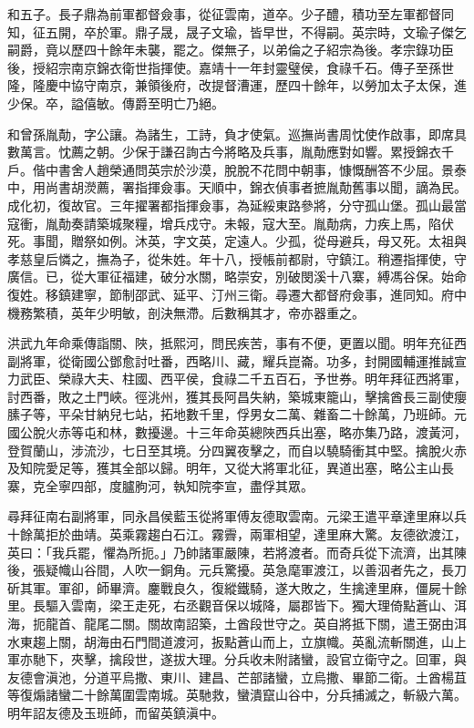 \begin{pinyinscope}
和五子。長子鼎為前軍都督僉事，從征雲南，道卒。少子醴，積功至左軍都督同知，征五開，卒於軍。鼎子晟，晟子文瑜，皆早世，不得嗣。英宗時，文瑜子傑乞嗣爵，竟以歷四十餘年未襲，罷之。傑無子，以弟倫之子紹宗為後。孝宗錄功臣後，授紹宗南京錦衣衛世指揮使。嘉靖十一年封靈璧侯，食祿千石。傳子至孫世隆，隆慶中協守南京，兼領後府，改提督漕運，歷四十餘年，以勞加太子太保，進少保。卒，謚僖敏。傳爵至明亡乃絕。

和曾孫胤勣，字公讓。為諸生，工詩，負才使氣。巡撫尚書周忱使作啟事，即席具數萬言。忱薦之朝。少保于謙召詢古今將略及兵事，胤勣應對如響。累授錦衣千戶。偕中書舍人趙榮通問英宗於沙漠，脫脫不花問中朝事，慷慨酬答不少屈。景泰中，用尚書胡濙薦，署指揮僉事。天順中，錦衣偵事者摭胤勣舊事以聞，謫為民。成化初，復故官。三年擢署都指揮僉事，為延綏東路參將，分守孤山堡。孤山最當寇衝，胤勣奏請築城聚糧，增兵戍守。未報，寇大至。胤勣病，力疾上馬，陷伏死。事聞，贈祭如例。沐英，字文英，定遠人。少孤，從母避兵，母又死。太祖與孝慈皇后憐之，撫為子，從朱姓。年十八，授帳前都尉，守鎮江。稍遷指揮使，守廣信。已，從大軍征福建，破分水關，略崇安，別破閔溪十八寨，縛馮谷保。始命復姓。移鎮建寧，節制邵武、延平、汀州三衛。尋遷大都督府僉事，進同知。府中機務繁積，英年少明敏，剖決無滯。后數稱其才，帝亦器重之。

洪武九年命乘傳詣關、陜，抵熙河，問民疾苦，事有不便，更置以聞。明年充征西副將軍，從衛國公鄧愈討吐番，西略川、藏，耀兵崑崙。功多，封開國輔運推誠宣力武臣、榮祿大夫、柱國、西平侯，食祿二千五百石，予世券。明年拜征西將軍，討西番，敗之土門峽。徑洮州，獲其長阿昌失納，築城東籠山，擊擒酋長三副使癭膆子等，平朵甘納兒七站，拓地數千里，俘男女二萬、雜畜二十餘萬，乃班師。元國公脫火赤等屯和林，數擾邊。十三年命英總陜西兵出塞，略亦集乃路，渡黃河，登賀蘭山，涉流沙，七日至其境。分四翼夜擊之，而自以驍騎衝其中堅。擒脫火赤及知院愛足等，獲其全部以歸。明年，又從大將軍北征，異道出塞，略公主山長寨，克全寧四部，度臚朐河，執知院李宣，盡俘其眾。

尋拜征南右副將軍，同永昌侯藍玉從將軍傅友德取雲南。元梁王遣平章達里麻以兵十餘萬拒於曲靖。英乘霧趨白石江。霧霽，兩軍相望，達里麻大驚。友德欲渡江，英曰：「我兵罷，懼為所扼。」乃帥諸軍嚴陳，若將渡者。而奇兵從下流濟，出其陳後，張疑幟山谷間，人吹一銅角。元兵驚擾。英急麾軍渡江，以善泅者先之，長刀斫其軍。軍卻，師畢濟。鏖戰良久，復縱鐵騎，遂大敗之，生擒達里麻，僵屍十餘里。長驅入雲南，梁王走死，右丞觀音保以城降，屬郡皆下。獨大理倚點蒼山、洱海，扼龍首、龍尾二關。關故南詔築，土酋段世守之。英自將抵下關，遣王弼由洱水東趨上關，胡海由石門間道渡河，扳點蒼山而上，立旗幟。英亂流斬關進，山上軍亦馳下，夾擊，擒段世，遂拔大理。分兵收未附諸蠻，設官立衛守之。回軍，與友德會滇池，分道平烏撒、東川、建昌、芒部諸蠻，立烏撒、畢節二衛。土酋楊苴等復煽諸蠻二十餘萬圍雲南城。英馳救，蠻潰竄山谷中，分兵捕滅之，斬級六萬。明年詔友德及玉班師，而留英鎮滇中。


\end{pinyinscope}
